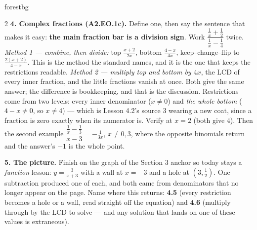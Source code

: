 \documentclass[10pt]{article}
\begin{document}
\begin{skillbox}[Lesson]{forestbg}
\begin{multicols}{2}
\textbf{4. Complex fractions (A2.EO.1c).} Define one, then say the sentence that makes it easy:
\textbf{the main fraction bar is a division sign}. Work
$\dfrac{\frac1x+\frac12}{\frac1x-\frac14}$ twice. \emph{Method 1 --- combine, then divide:} top
$\frac{x+2}{2x}$, bottom $\frac{4-x}{4x}$, keep--change--flip to $\frac{2(x+2)}{4-x}$. This is the
method the standard names, and it is the one that keeps the restrictions readable. \emph{Method 2 ---
multiply top and bottom by $4x$}, the LCD of every inner fraction, and the little fractions vanish at
once. Both give the same answer; the difference is bookkeeping, and that is the discussion. Restrictions
come from two levels: every inner denominator ($x\neq0$) and \emph{the whole bottom} ($4-x\neq0$, so
$x\neq4$) --- which is Lesson 4.2's source 3 wearing a new coat, since a fraction is zero exactly when
its numerator is. Verify at $x=2$ (both give $4$). Then the second example
$\dfrac{\frac1x-\frac13}{x-3}=-\frac{1}{3x}$, $x\neq0,3$, where the opposite binomials return and the
answer's $-1$ is the whole point.

\textbf{5. The picture.} Finish on the graph of the Section 3 anchor so today stays a \emph{function}
lesson: $y=\frac{3}{x+3}$ with a wall at $x=-3$ and a hole at $\left(3,\frac12\right)$. One subtraction
produced one of each, and both came from denominators that no longer appear on the page. Name where this
returns: \textbf{4.5} (every restriction becomes a hole or a wall, read straight off the equation) and
\textbf{4.6} (multiply through by the LCD to solve --- and any solution that lands on one of these values
is extraneous).
\end{multicols}
\end{skillbox}
\end{document}
